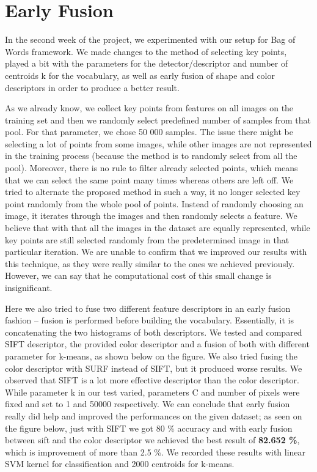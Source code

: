 \section{Early Fusion}
	\indent	In the second week of the project, we experimented with our setup for Bag of Words framework. We made changes to the method of selecting key points, played a bit with the parameters for the detector/descriptor and number of centroids k for the vocabulary, as well as early fusion of shape and color descriptors in order to produce a better result.
\par	As we already know, we collect key points from features on all images on the training set and then we randomly select predefined number of samples from that pool. For that parameter, we chose 50 000 samples. The issue there might be selecting a lot of points from some images, while other images are not represented in the training process (because the method is to randomly select from all the pool). Moreover, there is no rule to filter already selected points, which means that we can select the same point many times whereas others are left off. We tried to alternate the proposed method in such a way, it no longer selected key point randomly from the whole pool of points. Instead of randomly choosing an image, it iterates through the images and then randomly selects a feature. We believe that with that all the images in the dataset are equally represented, while key points are still selected randomly from the predetermined image in that particular iteration. We are unable to confirm that we improved our results with this technique, as they were really similar to the ones we achieved previously. However, we can say that he computational cost of this small change is insignificant.
\par	Here we also tried to fuse two different feature descriptors in an early fusion fashion – fusion is performed before building the vocabulary. Essentially, it is concatenating the two histograms of both descriptors. We tested  and compared SIFT descriptor, the provided color descriptor and a fusion of both with different parameter for k-means, as shown below on the figure. We also tried fusing the color descriptor with SURF instead of SIFT, but it produced worse results. We observed that SIFT is a lot more effective descriptor than the color descriptor. While parameter k in our test varied, parameters C and number of pixels were fixed and set to 1 and 50000 respectively. We can conclude that early fusion really did help and improved the performances on the given dataset; as seen on the figure below, just with SIFT we got 80 \% accuracy and with early fusion between sift and the color descriptor we achieved the best result of \textbf{82.652 \%}, which is improvement of more than 2.5 \%. We recorded these results with linear SVM kernel for classification and 2000 centroids for k-means. 

